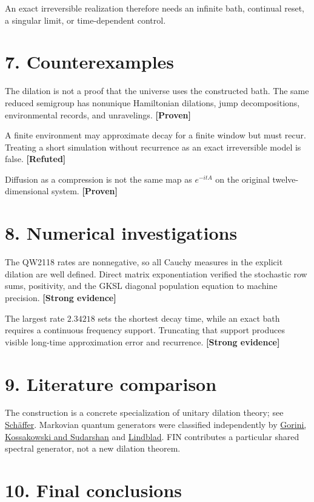 \documentclass[11pt,a4paper,openany]{report}
\newcommand{\statusProven}{\textcolor{fingreen}{[Proven]}}
\newcommand{\statusStrong}{\textcolor{finblue}{[Strong evidence]}}
\newcommand{\statusRefuted}{\textcolor{finred}{[Refuted]}}
\begin{document}
An exact irreversible realization therefore needs an infinite bath, continual reset, a singular limit, or time-dependent control.

\section{7. Counterexamples}

The dilation is not a proof that the universe uses the constructed bath. The same reduced semigroup has nonunique Hamiltonian dilations, jump decompositions, environmental records, and unravelings. \textbf{\statusProven{}}

A finite environment may approximate decay for a finite window but must recur. Treating a short simulation without recurrence as an exact irreversible model is false. \textbf{\statusRefuted{}}

Diffusion as a compression is not the same map as \(e^{-itA}\) on the original twelve-dimensional system. \textbf{\statusProven{}}

\section{8. Numerical investigations}

The QW2118 rates are nonnegative, so all Cauchy measures in the explicit dilation are well defined. Direct matrix exponentiation verified the stochastic row sums, positivity, and the GKSL diagonal population equation to machine precision. \textbf{\statusStrong{}}

The largest rate \(2.34218\) sets the shortest decay time, while an exact bath requires a continuous frequency support. Truncating that support produces visible long-time approximation error and recurrence. \textbf{\statusStrong{}}

\section{9. Literature comparison}

The construction is a concrete specialization of unitary dilation theory; see \href{https://doi.org/10.1090/S0002-9939-1955-0068740-7}{Schäffer}. Markovian quantum generators were classified independently by \href{https://doi.org/10.1063/1.522979}{Gorini, Kossakowski and Sudarshan} and \href{https://doi.org/10.1007/BF01608499}{Lindblad}. FIN contributes a particular shared spectral generator, not a new dilation theorem.

\section{10. Final conclusions}
\end{document}
